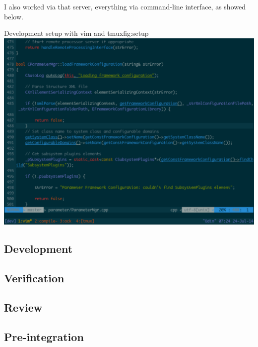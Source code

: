 I also worked via that server, everything via command-line interface, as showed below.
\begin{figureGraphics}{Development setup with vim and tmux}{fig:setup}
\includegraphics[width=\textwidth]{./src/img/setup.pdf}
\end{figureGraphics}

\subsection{Development}
\subsection{Verification}
\subsection{Review}
\subsection{Pre-integration}
